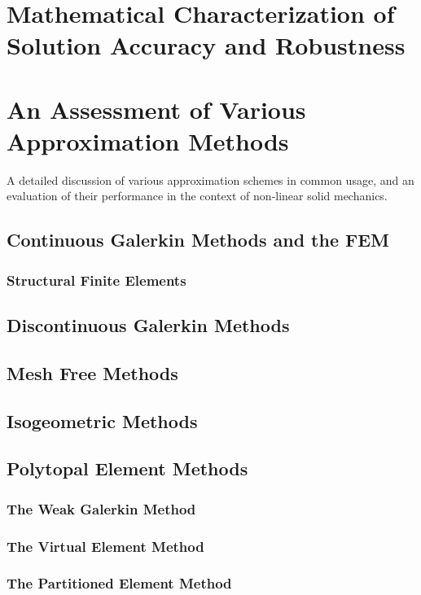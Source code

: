 \section{Mathematical Characterization of Solution Accuracy and Robustness}

\section{An Assessment of Various Approximation Methods}
%
A detailed discussion of various approximation schemes in common usage, and an evaluation of their performance in the context of non-linear solid mechanics.
\subsection{Continuous Galerkin Methods and the FEM}
\subsubsection{Structural Finite Elements}

\subsection{Discontinuous Galerkin Methods}

\subsection{Mesh Free Methods}

\subsection{Isogeometric Methods}

\subsection{Polytopal Element Methods}
\subsubsection{The Weak Galerkin Method}
\subsubsection{The Virtual Element Method}
\subsubsection{The Partitioned Element Method}

